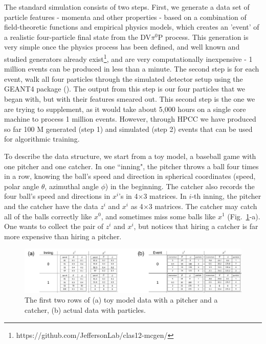 \documentclass{article}
\begin{document}
The standard simulation consists of two steps. First, we generate a data set of particle features - momenta and other properties - based on a combination of field-theoretic functions and empirical physics models, which creates an 'event' of a realistic four-particle final state from the DV$\pi^0$P process. This generation is very simple once the physics process has been defined, and well known and studied generators already exist\footnote{https://github.com/JeffersonLab/clas12-mcgen/}, and are very computationally inexpensive - 1 million events can be produced in less than a minute. The second step is for each event, walk all four particles through the simulated detector setup using the GEANT4 package (\citet{AGOSTINELLI2003250}). The output from this step is our four particles that we began with, but with their features smeared out. This second step is the one we are trying to supplement, as it would take about 5,000 hours on a single core machine to process 1 million events. However, through HPCC we have produced so far 100 M generated (step 1) and simulated (step 2) events that can be used for algorithmic training. 


To describe the data structure, we start from a toy model, a baseball game with one pitcher and one catcher. In one ``inning", the pitcher throws a ball four times in a row, knowing the ball's speed and direction in spherical coordinates (speed, polar angle $\theta$, azimuthal angle $\phi$) in the beginning. The catcher also records the four ball's speed and directions in $x^{i}$'s in 4$\times$3 matrices. In $i$-th inning, the pitcher and the catcher have the data $z^{i}$ and $x^i$ as 4$\times$3 matrices. The catcher may catch all of the balls correctly like $x^0$, and sometimes miss some balls like $x^1$ (Fig.~\ref{data}-a). One wants to collect the pair of $z^i$ and $x^i$, but notices that hiring a catcher is far more expensive than hiring a pitcher.

\begin{figure}[!ht]
 \centering
   \includegraphics[width=0.8\linewidth]{dataDescription.pdf}
  \caption{The first two rows of (a) toy model data with a pitcher and a catcher, (b) actual data with particles.}
  \label{data}
\end{figure}
\end{document}
